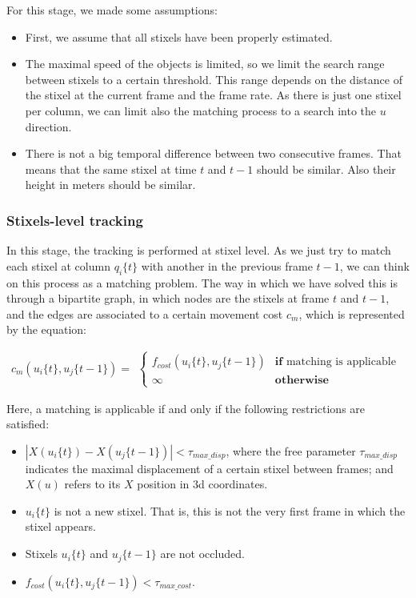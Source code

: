 For this stage, we made some assumptions:
\begin{itemize}
 \item First, we assume that all stixels have been properly estimated.
 \item The maximal speed of the objects is limited, so we limit the search range between stixels to a certain threshold. This range depends on the distance of the stixel at the current frame and the frame rate. As there is just one stixel per column, we can limit also the matching process to a search into the $u$ direction.
 \item There is not a big temporal difference between two consecutive frames. That means that the same stixel at time $t$ and $t - 1$ should be similar. Also their height in meters should be similar. 
\end{itemize}

\subsubsection{Stixels-level tracking}\label{ch:chapter04_01_03_01}

In this stage, the tracking is performed at stixel level. As we just try to match each stixel at column $q_i\{t\}$ with another in the previous frame $t - 1$, we can think on this process as a matching problem. The way in which we have solved this is through a bipartite graph, in which nodes are the stixels at frame $t$ and $t - 1$, and the edges are associated to a certain movement cost $c_m$, which is represented by the equation:

\begin{equation}\label{eq:cp04_stixel_movement_cost}
  c_m(u_i\{t\}, u_j\{t - 1\}) = 
  \begin{align*}
    \begin{cases}
    f_{cost}(u_i\{t\}, u_j\{t - 1\}) & \textbf{if} \text{ matching is applicable} \\
    \infty & \textbf{otherwise}
    \end{cases}
  \end{align*}
\end{equation}

Here, a matching is applicable if and only if the following restrictions are satisfied:
\begin{itemize}
 \item $|X(u_i\{t\}) - X(u_j\{t - 1\})| < \tau_{max\_disp}$, where the free parameter $\tau_{max\_disp}$ indicates the maximal displacement of a certain stixel between frames; and $X(u)$ refers to its $X$ position in 3d coordinates.
 \item $u_i\{t\}$ is not a new stixel. That is, this is not the very first frame in which the stixel appears.
 \item Stixels $u_i\{t\}$ and $u_j\{t - 1\}$ are not occluded.
 \item $f_{cost}(u_i\{t\}, u_j\{t - 1\}) < \tau_{max\_cost}$.
\end{itemize}

